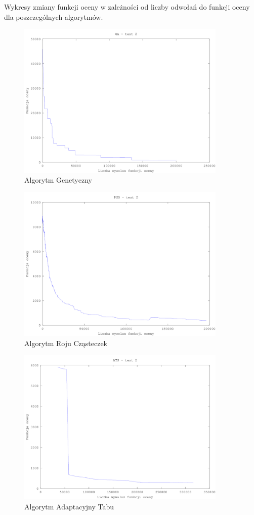 \par  Wykresy zmiany funkcji oceny w zależności od liczby odwołań do funkcji oceny dla poszczególnych algorytmów.
\begin{figure}[H]
  \caption{Algorytm Genetyczny}
  \centering
    \includegraphics[width=10cm]{ga_test_2.png}
\end{figure}
\begin{figure}[H]
  \caption{Algorytm Roju Cząsteczek}
  \centering
    \includegraphics[width=10cm]{pso_2.png}
\end{figure}
\begin{figure}[H]
  \caption{Algorytm Adaptacyjny Tabu}
  \centering
    \includegraphics[width=10cm]{ats_test_2.png}
\end{figure}
